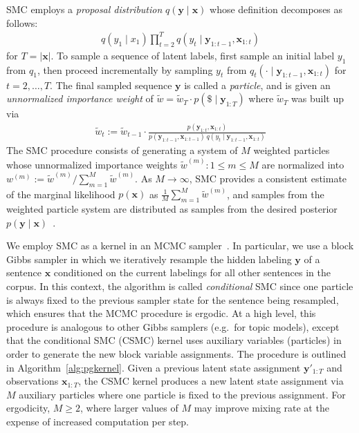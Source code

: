 \documentclass[11pt]{article}
\newcommand{\EOS}{\$}
\begin{document}
SMC employs a {\em proposal distribution} $q(\bm{y} \mid \bm{x})$ whose definition decomposes as follows:
\begin{align}
q(y_1 \mid x_1) \prod_{t=2}^T q(y_t \mid \bm{y}_{1:t-1}, \bm{x}_{1:t})
\end{align}
for $T=|\bm{x}|$.
To sample a sequence of latent labels, first sample an initial label $y_1$ from $q_1$,
then proceed incrementally by sampling $y_t$ from $q_t(\cdot \mid \bm{y}_{1:t-1}, \bm{x}_{1:t})$ for
$t=2,\ldots,T$.  The final sampled sequence $\bm{y}$
is called a {\it
  particle}, and is given an {\em unnormalized importance weight} of $\tilde{w} = \tilde{w}_T \cdot p(\EOS \mid \bm{y}_{1:T})$ where $\tilde{w}_T$ was built up via
\begin{align}\label{eqn:incr}
\tilde{w}_t := \tilde{w}_{t-1} \cdot \frac{p(\bm{y}_{1:t}, \bm{x}_{1:t})}{p(\bm{y}_{1:t-1}, \bm{x}_{1:t-1})\,q(y_t\mid \bm{y}_{1:t-1}, \bm{x}_{1:t})}
\end{align}
The SMC procedure consists of generating a system of
$M$ weighted particles whose unnormalized importance
weights $\tilde{w}^{(m)}: 1 \leq m \leq M$ are normalized into $w^{(m)} := \tilde{w}^{(m)} / \sum_{m=1}^M
\tilde{w}^{(m)}$. As $M \rightarrow
\infty$, SMC provides a consistent estimate of the marginal likelihood
$p(\bm{x})$ as $\frac{1}{M} \sum_{m=1}^M \tilde{w}^{(m)}$,
and samples from the weighted particle system are distributed as
samples from the desired posterior $p(\bm{y}\mid\bm{x})$~\cite{doucet2009tutorial}.

\vspace{5pt}

 We employ SMC as a kernel in an MCMC sampler~\cite{andrieu2010particle}. In
particular, we use a block Gibbs sampler in which we iteratively
resample the hidden labeling $\bm{y}$ of a sentence $\bm{x}$
conditioned on the current labelings for all other sentences in the corpus. In this
context, the algorithm is called {\it conditional\/} SMC since one
particle is always fixed to the previous sampler state for the sentence being resampled, which ensures that the MCMC procedure is ergodic. At a high
level, this procedure is analogous to other Gibbs samplers
(e.g.\ for topic models), except that the conditional SMC (CSMC) kernel uses
auxiliary variables (particles) in order to generate the new block
variable assignments.
The procedure is outlined in Algorithm~\ref{alg:pgkernel}. Given a previous latent state assignment $\bm{y}'_{1:T}$ and observations $\bm{x}_{1:T}$, the CSMC kernel produces a new latent state assignment via $M$ auxiliary particles where one particle is fixed to the previous assignment. For ergodicity, $M \geq 2$, where larger values of $M$ may improve mixing rate at the expense of increased computation per step.
\end{document}
